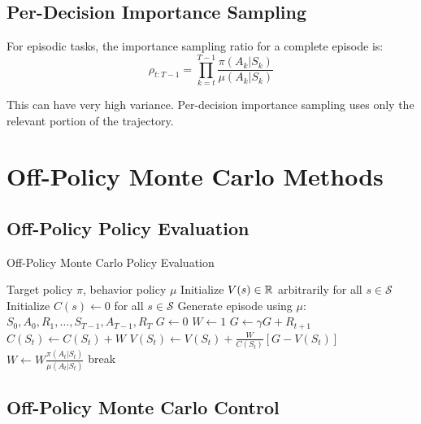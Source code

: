 \subsection{Per-Decision Importance Sampling}

For episodic tasks, the importance sampling ratio for a complete episode is:
\begin{equation}
\rho_{t:T-1} = \prod_{k=t}^{T-1} \frac{\pi(A_k|S_k)}{\mu(A_k|S_k)}
\end{equation}

This can have very high variance. Per-decision importance sampling uses only the relevant portion of the trajectory.

\section{Off-Policy Monte Carlo Methods}

\subsection{Off-Policy Policy Evaluation}

\begin{algorithm}
\caption{Off-Policy Monte Carlo Policy Evaluation}
\begin{algorithmic}
\REQUIRE Target policy $\pi$, behavior policy $\mu$
\STATE Initialize $V(s) \in \mathbb{R}$ arbitrarily for all $s \in \mathcal{S}$
\STATE Initialize $C(s) \leftarrow 0$ for all $s \in \mathcal{S}$
\REPEAT
    \STATE Generate episode using $\mu$: $S_0, A_0, R_1, \ldots, S_{T-1}, A_{T-1}, R_T$
    \STATE $G \leftarrow 0$
    \STATE $W \leftarrow 1$
        \STATE $G \leftarrow \gamma G + R_{t+1}$
        \STATE $C(S_t) \leftarrow C(S_t) + W$
        \STATE $V(S_t) \leftarrow V(S_t) + \frac{W}{C(S_t)}[G - V(S_t)]$
        \STATE $W \leftarrow W \frac{\pi(A_t|S_t)}{\mu(A_t|S_t)}$
            \STATE break
        \ENDIF
    \ENDFOR
{}
\end{algorithmic}
\end{algorithm}

\subsection{Off-Policy Monte Carlo Control}

